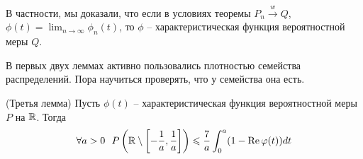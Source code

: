 \begin{note}
    В частности, мы доказали, что если в условиях теоремы $P_n \xrightarrow{w} Q$, $\phi(t) = \lim_{n \to \infty} \phi_n(t)$, то $\phi$ -- характеристическая функция вероятностной меры $Q$.
\end{note}

\begin{note}
    В первых двух леммах активно пользовались плотностью семейства распределений. Пора научиться проверять, что у семейства она есть.
\end{note}

\begin{lemma} (Третья лемма)
    Пусть $\phi(t)$ -- характеристическая функция вероятностной меры $P$ на $\mathbb{R}$. Тогда
    \[
        \forall a > 0\ \ P\left(\mathbb{R} \setminus \left[-\frac{1}{a}, \frac{1}{a}\right]\right) \leqslant \frac{7}{a} \int_0^a (1 - \operatorname{Re}\varphi(t))dt
    \]
\end{lemma}

